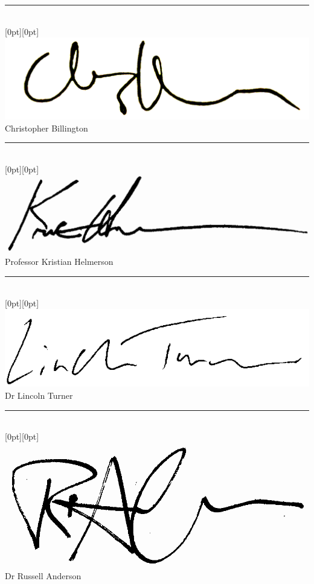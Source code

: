 \begin{center}
\vspace{1.5cm}
\rule{8cm}{1pt}\\
\raisebox{0.5cm}[0pt][0pt]{\includegraphics[scale=0.1]{submission/cjb}}\\
Christopher Billington

\vspace{1.5cm}
\rule{8cm}{1pt}\\
\raisebox{0.5cm}[0pt][0pt]{\includegraphics[scale=0.15]{submission/kh}}\\
Professor Kristian Helmerson  

\vspace{1.5cm}
\rule{8cm}{1pt}\\
\raisebox{0.6cm}[0pt][0pt]{\includegraphics[scale=0.9]{submission/ldt}}\\
Dr Lincoln Turner

\vspace{1.5cm}
\rule{8cm}{1pt}\\
\raisebox{0.5cm}[0pt][0pt]{\includegraphics[scale=0.1]{submission/rpa}}\\
Dr Russell Anderson 

\end{center}

